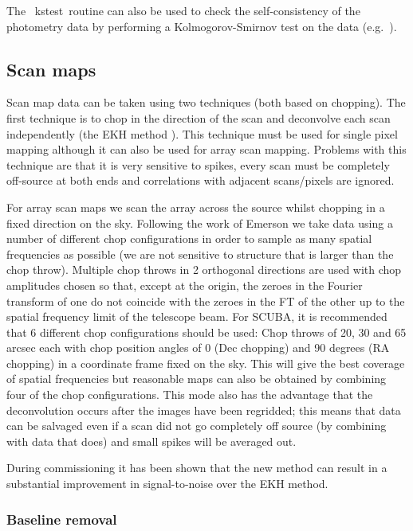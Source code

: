 \documentclass[twoside,11pt]{article}
\newcommand{\Kappa}{\xref{{\sc{Kappa}}}{sun95}{}}
\newcommand{\task}[1]{{\sf #1}}
\newcommand{\kstest}{\xref{\task{kstest}}{sun95}{KSTEST}}
\newcommand{\xref}[3]{#1}
\renewcommand{\_}{\texttt{\symbol{95}}}
\begin{document}
The \Kappa\ \kstest\ routine can also be used to check the
self-consistency of the photometry data by performing a Kolmogorov-Smirnov
test on the data (e.g.\ \cite{dhh}).


\subsection{Scan maps}

Scan map data can be taken using two techniques (both based on chopping).  The
first technique is to chop in the direction of the scan and deconvolve each
scan independently (the EKH method \cite{ekh}).  This technique must be used
for single pixel mapping although it can also be used for array scan mapping.
Problems with this technique are that it is very sensitive to spikes, 
every scan must be completely off-source at both ends and correlations
with adjacent scans/pixels are ignored.

For array scan maps we scan the array across the source whilst chopping in a
fixed direction on the sky. Following the work of Emerson\cite{EII} we take
data using a number of different chop configurations in order to sample as
many spatial frequencies as possible (we are not sensitive to structure that
is larger than the chop throw). Multiple chop throws in 2 orthogonal
directions are used with chop amplitudes chosen so that, except at the origin,
the zeroes in the Fourier transform of one do not coincide with the zeroes in
the FT of the other up to the spatial frequency limit of the telescope
beam. For SCUBA, it is recommended that 6 different chop configurations should
be used: Chop throws of 20, 30 and 65 arcsec each with chop position angles of
0 (Dec chopping) and 90 degrees (RA chopping) in a coordinate frame fixed on
the sky. This will give the best coverage of spatial frequencies but reasonable
maps can also be obtained by combining four of the chop configurations.
This mode also has the advantage that the deconvolution occurs after the
images have been regridded; this means that data can be salvaged even if
a scan did not go completely off source (by combining with data that does)
and small spikes will be averaged out.

During commissioning it has been shown that the new method can result in 
a substantial improvement in signal-to-noise over the EKH
method\cite{spietj}. 

\subsubsection{Baseline removal}
\end{document}
